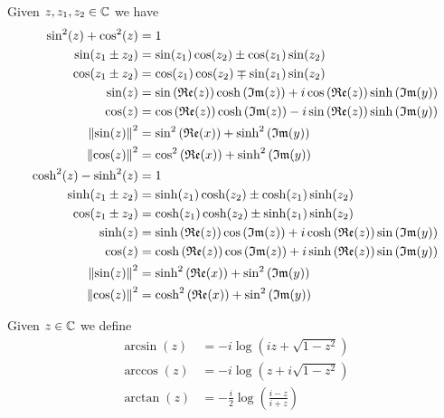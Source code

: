 \documentclass[../complete.tex]{subfiles}
\begin{document}
\begin{thm}
	Given $z,z_1,z_2\in\mathbb{C}$ we have
	\begin{equation}
		\begin{aligned}
			\sin^2(z)+\cos^2(z)&=1\\
			\sin(z_1\pm z_2)&=\sin(z_1)\cos(z_2)\pm\cos(z_1)\sin(z_2)\\
			\cos(z_1\pm z_2)&=\cos(z_1)\cos(z_2)\mp\sin(z_1)\sin(z_2)\\
			\sin(z)&=\sin\left( \mathfrak{Re}(z) \right)\cosh\left( \mathfrak{Im}(z) \right)+i\cos\left( \mathfrak{Re}(z) \right)\sinh\left( \mathfrak{Im}(y) \right)\\
			\cos(z)&=\cos\left( \mathfrak{Re}(z) \right)\cosh\left( \mathfrak{Im}(z) \right)-i\sin\left( \mathfrak{Re}(z) \right)\sinh\left( \mathfrak{Im}(y) \right)\\
			\norm{\sin(z)}^2&=\sin^2\left( \mathfrak{Re}(x) \right)+\sinh^2\left( \mathfrak{Im}(y) \right)\\
			\norm{\cos(z)}^2&=\cos^2\left( \mathfrak{Re}(x) \right)+\sinh^2\left( \mathfrak{Im}(y) \right)\\
			\cosh^2(z)-\sinh^2(z)&=1\\
			\sinh(z_1\pm z_2)&=\sinh(z_1)\cosh(z_2)\pm\cosh(z_1)\sinh(z_2)\\
			\cos(z_1\pm z_2)&=\cosh(z_1)\cosh(z_2)\pm\sinh(z_1)\sinh(z_2)\\
			\sinh(z)&=\sinh\left( \mathfrak{Re}(z) \right)\cos\left( \mathfrak{Im}(z) \right)+i\cosh\left( \mathfrak{Re}(z) \right)\sin\left( \mathfrak{Im}(y) \right)\\
			\cos(z)&=\cosh\left( \mathfrak{Re}(z) \right)\cos\left( \mathfrak{Im}(z) \right)+i\sinh\left( \mathfrak{Re}(z) \right)\sin\left( \mathfrak{Im}(y) \right)\\
			\norm{\sin(z)}^2&=\sinh^2\left( \mathfrak{Re}(x) \right)+\sin^2\left( \mathfrak{Im}(y) \right)\\
			\norm{\cos(z)}^2&=\cosh^2\left( \mathfrak{Re}(x) \right)+\sin^2\left( \mathfrak{Im}(y) \right)\\
		\end{aligned}
		\label{eq:trigidentities}
	\end{equation}
\end{thm}
\begin{dfn}
	Given $z\in\mathbb{C}$ we define
	\begin{equation}
		\begin{aligned}
			\arcsin(z)&=-i\log\left( iz+\sqrt{1-z^2} \right)\\
			\arccos(z)&=-i\log\left( z+i\sqrt{1-z^2} \right)\\
			\arctan(z)&=-\frac{i}{2}\log\left( \frac{i-z}{i+z} \right)
		\end{aligned}
		\label{eq:inversetrig}
	\end{equation}
\end{dfn}
\end{document}
